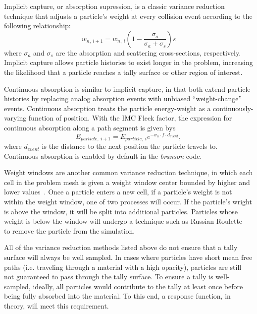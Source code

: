 Implicit capture, or absorption supression, is a classic variance reduction technique that adjusts a particle's weight at every collision event according to the following relationship:
\begin{equation}
w_{n,~i+1} = w_{n,~i}(1 - \frac{\sigma_{a}}{\sigma_{a} + \sigma_{s}})s
\end{equation}
where $\sigma_{a}$ and $\sigma_{s}$ are the absorption and scattering cross-sections, respectively. Implicit capture allows particle histories to exist longer in the problem, increasing the likelihood that a particle reaches a tally surface or other region of interest. 

Continuous absorption is similar to implicit capture, in that both extend particle histories by replacing analog absorption events with unbiased ``weight-change'' events.  Continuous absorption treats the particle energy-weight as a continuously-varying function of position. With the IMC Fleck factor, the expression for continuous absorption along a path segment is given bys
\begin{equation} \label{Eq: new_E}
E_{particle,~i+1} = E_{particle,~i}e^{-\sigma_{a} \cdot f \cdot d_{event}},
\end{equation}
where $d_{event}$ is the distance to the next position the particle travels to.  Continuous absorption is enabled by default in the \textit{branson} code.

Weight windows are another common variance reduction technique, in which each cell in the problem mesh is given a weight window center bounded by higher and lower values~\cite{JL16}. Once a particle enters a new cell, if a particle's weight is not within the weight window, one of two processes will occur. If the particle's wright is above the window, it will be split into additional particles. Particles whose weight is below the window will undergo a technique such as Russian Roulette~\cite{LM93} to remove the particle from the simulation.

All of the variance reduction methods listed above do not ensure that a tally surface will always be well sampled. In cases where particles have short mean free paths (i.e. traveling through a material with a high opacity), particles are still not guaranteed to pass through the tally surface. To ensure a tally is  well-sampled, ideally, all particles would contribute to the tally at least once before being fully absorbed into the material. To this end, a response function, in theory, will meet this requirement.

